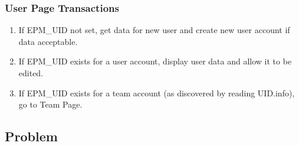 \documentclass[12pt]{article}
\begin{document}
\subsubsection{User Page Transactions}

\begin{enumerate}
\item If EPM\_UID not set, get data for new user and create
      new user account if data acceptable.
\item If EPM\_UID exists for a user account, display
      user data and allow it to be edited.
\item If EPM\_UID exists for a team account (as discovered
      by reading UID.info), go to Team Page.
\end{enumerate}

\subsection{Problem}
\end{document}

